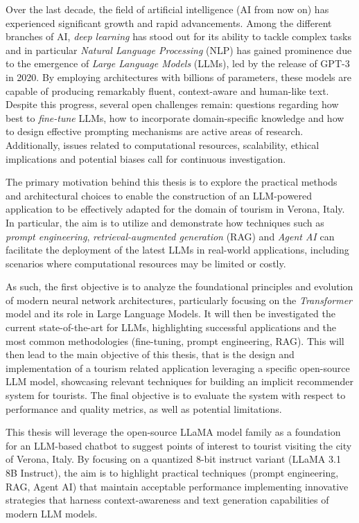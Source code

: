 Over the last decade, the field of artificial intelligence (AI from now on) has experienced significant growth and rapid advancements. Among the different branches of AI, \textit{deep learning} has stood out for its ability to tackle complex tasks and in particular \textit{Natural Language Processing} (NLP) has gained prominence due to the emergence of \textit{Large Language Models} (LLMs), led by the release of GPT-3 in 2020. \cite{brown2020language} By employing architectures with billions of parameters, these models are capable of producing remarkably fluent, context-aware and human-like text. Despite this progress, several open challenges remain: questions regarding how best to \textit{fine-tune} LLMs, how to incorporate domain-specific knowledge and how to design effective prompting mechanisms are active areas of research. Additionally, issues related to computational resources, scalability, ethical implications and potential biases call for continuous investigation.

The primary motivation behind this thesis is to explore the practical methods and architectural choices to enable the construction of an LLM-powered application to be effectively adapted for the domain of tourism in Verona, Italy. In particular, the aim is to utilize and demonstrate how techniques such as \textit{prompt engineering}, \textit{retrieval-augmented generation} (RAG) and \textit{Agent AI} can facilitate the deployment of the latest LLMs in real-world applications, including scenarios where computational resources may be limited or costly.

As such, the first objective is to analyze the foundational principles and evolution of modern neural network architectures, particularly focusing on the \textit{Transformer} model and its role in Large Language Models. It will then be investigated the current state-of-the-art for LLMs, highlighting successful applications and the most common methodologies (fine-tuning, prompt engineering, RAG). This will then lead to the main objective of this thesis, that is the design and implementation of a tourism related application leveraging a specific open-source LLM model, showcasing relevant techniques for building an implicit recommender system for tourists. The final objective is to evaluate the system with respect to performance and quality metrics, as well as potential limitations.

This thesis will leverage the open-source LLaMA model family as a foundation for an LLM-based chatbot to suggest points of interest to tourist visiting the city of Verona, Italy. By focusing on a quantized 8-bit instruct variant (LLaMA 3.1 8B Instruct), the aim is to highlight practical techniques (prompt engineering, RAG, Agent AI) that maintain acceptable performance implementing innovative strategies that harness context-awareness and text generation capabilities of modern LLM models.

